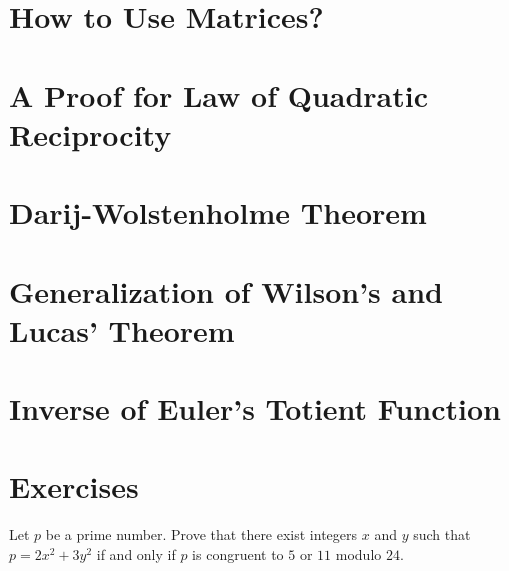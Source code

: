 \documentclass{subfile}
\begin{document}
	
		
	\section{How to Use Matrices?}
		


	\section{A Proof for Law of Quadratic Reciprocity}\label{sec:qrlawproof}
	
	
	\section{Darij-Wolstenholme Theorem}
	
	
	\section{Generalization of Wilson's and Lucas' Theorem}\label{sec:wilsongeneral}
	
	
	\section{Inverse of Euler's Totient Function}
	
	
	\newpage
	\section{Exercises}
	\begin{problem} %
		Let $p$ be a prime number. Prove that there exist integers $x$ and $y$ such that $p=2x^2+3y^2$ if and only if $p$ is congruent to $5$ or $11$ modulo $24$.
	\end{problem}
	
\end{document}
